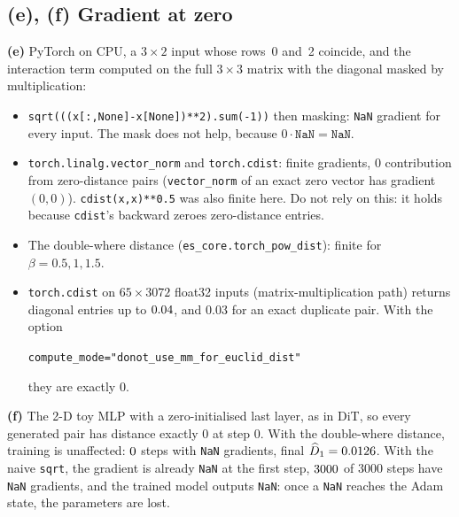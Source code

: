 \documentclass[11pt]{article}
\theoremstyle{definition}
\theoremstyle{remark}
\begin{document}
\subsection*{(e), (f) Gradient at zero}
\textbf{(e)} PyTorch \resTorchVersion{} on CPU, a $3\times2$ input whose rows~0 and~2 coincide, and the
interaction term computed on the full $3\times3$ matrix with the diagonal masked by multiplication:
\begin{itemize}
\item \texttt{sqrt(((x[:,None]-x[None])**2).sum(-1))} then masking: \texttt{NaN} gradient for every input. The
mask does not help, because $0\cdot\texttt{NaN}=\texttt{NaN}$.
\item \texttt{torch.linalg.vector\_norm} and \texttt{torch.cdist}: finite gradients, $0$ contribution from
zero-distance pairs (\texttt{vector\_norm} of an exact zero vector has gradient $(0,0)$). \texttt{cdist(x,x)**0.5}
was also finite here. Do not rely on this: it holds because \texttt{cdist}'s backward zeroes zero-distance
entries.
\item The double-where distance (\texttt{es\_core.torch\_pow\_dist}): finite for $\beta=0.5,1,1.5$.
\item \texttt{torch.cdist} on $65\times3072$ float32 inputs (matrix-multiplication path) returns diagonal
entries up to $0.04$, and $0.03$ for an exact duplicate pair. With the option
\begin{center}\texttt{compute\_mode="donot\_use\_mm\_for\_euclid\_dist"}\end{center}
they are exactly $0$.
\end{itemize}
\textbf{(f)} The 2-D toy MLP with a zero-initialised last layer, as in DiT, so every generated pair has
distance exactly $0$ at step $0$. With the double-where distance, training is unaffected:
$0$ steps with \texttt{NaN} gradients, final $\widehat D_1=0.0126$. With the naive
\texttt{sqrt}, the gradient is already \texttt{NaN} at the first step, $3000$ of $3000$ steps have
\texttt{NaN} gradients, and the trained model outputs \texttt{NaN}: once a \texttt{NaN} reaches the Adam
state, the parameters are lost.


\end{document}

